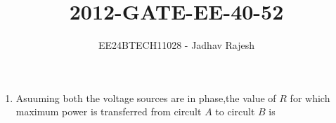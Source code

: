 \documentclass[journal]{IEEEtran}
\begin{document}

\vspace{3cm}
\title{2012-GATE-EE-40-52}
\author{EE24BTECH11028 - Jadhav Rajesh}
{\let\newpage\relax\maketitle}

\renewcommand{\thefigure}{\theenumi}
\renewcommand{\thetable}{\theenumi}
\setlength{\intextsep}{10pt} %


\renewcommand{\thetable}{\theenumi}
\begin{enumerate}
    \item Asuuming both the voltage sources are in phase,the value of $R$ for which maximum power is transferred from circult $A$ to circult $B$ is\\


\end{enumerate}
\end{document}
